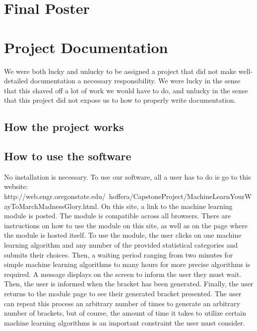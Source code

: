 \documentclass[onecolumn, draftclsnofoot,10pt, compsoc]{IEEEtran}
\begin{document}
\newpage
\section{Final Poster}

\newpage

\section{Project Documentation}
We were both lucky and unlucky to be assigned a project that did not make well-detailed documentation a necessary responsibility. We were lucky in the sense that this shaved off a lot of work we would have to do, and unlucky in the sense that this project did not expose us to how to properly write documentation.
\subsection{How the project works}

\subsection{How to use the software}
No installation is necessary. To use our software, all a user has to do is go to this website: http://web.engr.oregonstate.edu/~hoffera/CapstoneProject/MachineLearnYourWayToMarchMadnessGlory.html. On this site, a link to the machine learning module is posted. The module is compatible across all browsers. There are instructions on how to use the module on this site, as well as on the page where the module is hosted itself. To use the module, the user clicks on one machine learning algorithm and any number of the provided statistical categories and submits their choices. Then, a waiting period ranging from two minutes for simple machine learning algorithms to many hours for more precise algorithms is required. A message displays on the screen to inform the user they must wait. Then, the user is informed when the bracket has been generated. Finally, the user returns to the module page to see their generated bracket presented. The user can repeat this process an arbitrary number of times to generate an arbitrary number of brackets, but of course, the amount of time it takes to utilize certain machine learning algorithms is an important constraint the user must consider.
\end{document}
